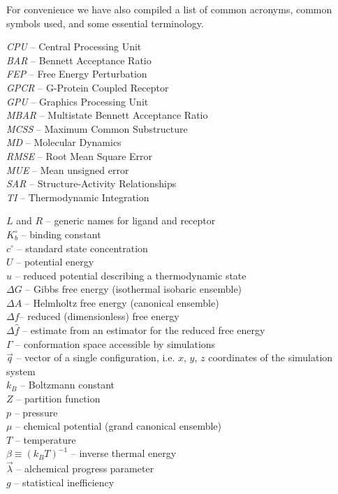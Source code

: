 \documentclass[9pt,bestpractices]{livecoms}
\begin{document}
For convenience we have also compiled a list of common acronyms, common symbols used, and some essential terminology.
\begin{tcolorbox}[title=Acronyms, colback=blue!10!white]
    \textit{CPU} -- Central Processing Unit\\
    \textit{BAR} -- Bennett Acceptance Ratio\\
    \textit{FEP} -- Free Energy Perturbation\\
    \textit{GPCR} -- G-Protein Coupled Receptor\\
    \textit{GPU} -- Graphics Processing Unit\\
    \textit{MBAR} -- Multistate Bennett Acceptance Ratio\\
    \textit{MCSS} -- Maximum Common Substructure\\
    \textit{MD} -- Molecular Dynamics\\
    \textit{RMSE} -- Root Mean Square Error\\
    \textit{MUE} -- Mean unsigned error\\
    \textit{SAR} -- Structure-Activity Relationships\\
    \textit{TI} -- Thermodynamic Integration
\end{tcolorbox}


\begin{tcolorbox}[title=List of Symbols, colback=green!10!white]
$L$ and $R$ -- generic names for ligand and receptor\\
$K_b^{\circ}$ -- binding  constant \\
$c^{\circ}$ -- standard state concentration \\
$U$ -- potential energy\\
$u$ -- reduced potential describing a thermodynamic state \\
$\Delta G$ -- Gibbs free energy (isothermal isobaric ensemble)\\
$\Delta A$ -- Helmholtz free energy (canonical ensemble)\\
$\Delta f$-- reduced (dimensionless) free energy \\
$\Delta \hat{f}$ -- estimate from an estimator for the reduced free energy\\
$\Gamma$ -- conformation space accessible by simulations \\
$\vec{q}$ -- vector of a single configuration, i.e. $x$, $y$, $z$ coordinates of the simulation system\\
$k_B$ -- Boltzmann constant \\
$Z$ -- partition function \\
$p$ -- pressure \\
$\mu$ -- chemical potential (grand canonical ensemble)\\
$T$ -- temperature \\
$\beta \equiv (k_B T)^{-1}$ -- inverse thermal energy \\
$\vec{\lambda}$ -- alchemical progress parameter \\
$g$ -- statistical inefficiency
\end{tcolorbox}
\end{document}
